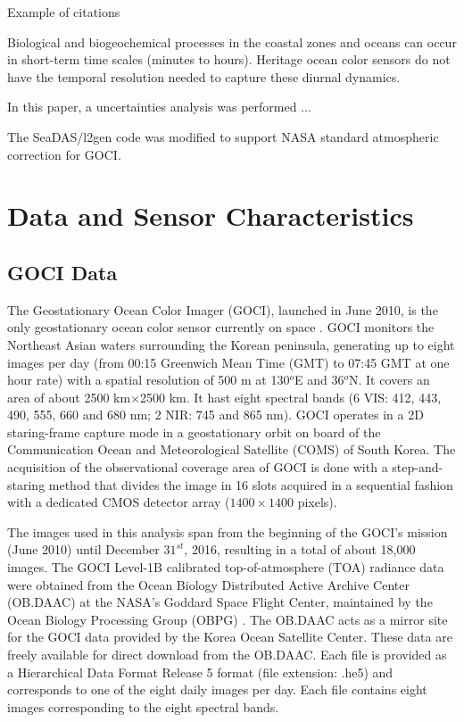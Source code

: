 \documentclass[onecolumn,3p,letterpaper,11pt]{elsarticle}
\begin{document}
Example of citations \citet{Ryu2011,He2013,Hu2016}

Biological and biogeochemical processes in the coastal zones and oceans can occur in short-term time scales (minutes to hours). Heritage ocean color sensors do not have the temporal resolution needed to capture these diurnal dynamics.

In this paper, a uncertainties analysis was performed ...

The SeaDAS/l2gen code was modified to support NASA standard atmospheric correction for GOCI.
\section{Data and Sensor Characteristics}
\subsection{GOCI Data}
The Geostationary Ocean Color Imager (GOCI), launched in June 2010, is the only geostationary ocean color sensor currently on space \citep{Ryu2012}. GOCI monitors the Northeast Asian waters surrounding the Korean peninsula, generating up to eight images per day (from 00:15 Greenwich Mean Time (GMT) to 07:45 GMT at one hour rate) with a spatial resolution of 500 m at 130$^o$E and 36$^o$N. It covers an area of about 2500 km$\times$2500 km. It hast eight spectral bands (6 VIS: 412, 443, 490, 555, 660 and 680 nm; 2 NIR: 745 and 865 nm). GOCI operates in a 2D staring-frame capture mode in a geostationary orbit on board of the Communication Ocean and Meteorological Satellite (COMS) of South Korea. The acquisition of the observational coverage area of GOCI is done with a step-and-staring method that divides the image in 16 slots acquired in a sequential fashion with a dedicated CMOS detector array ($1400\times1400$ pixels).

The images used in this analysis span from the beginning of the GOCI's mission (June 2010) until December $31^{st}$, 2016, resulting in a total of about 18,000 images. The GOCI Level-1B calibrated top-of-atmosphere (TOA) radiance data were obtained from the Ocean Biology Distributed Active Archive Center (OB.DAAC) at the NASA's Goddard Space Flight Center, maintained by the Ocean Biology Processing Group (OBPG) . The OB.DAAC acts as a mirror site for the GOCI data provided by the Korea Ocean Satellite Center. These data are freely available for direct download from the OB.DAAC. Each file is provided as a  Hierarchical Data Format Release 5 format (file extension: .he5) and corresponds to one of the eight daily images per day. Each file contains eight images corresponding to the eight spectral bands.
\end{document}
